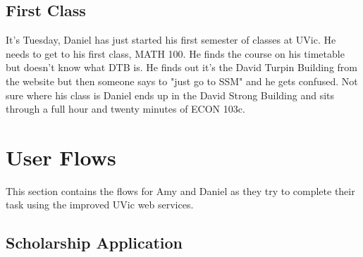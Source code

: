 \documentclass{article}
\begin{document}
\subsection{First Class}

It's Tuesday, Daniel has just started his first semester of classes at UVic. He needs to get to his first class, MATH 100. He finds the course on his timetable but doesn't know what DTB is. He finds out it's the David Turpin Building from the website but then someone says to "just go to SSM" and he gets confused. Not sure where his class is Daniel ends up in the David Strong Building and sits through a full hour and twenty minutes of ECON 103c.


\section{User Flows}

This section contains the flows for Amy and Daniel as they try to complete their task using the improved UVic web services.

\subsection{Scholarship Application}



%
%
%



%
%
%



\end{document}

